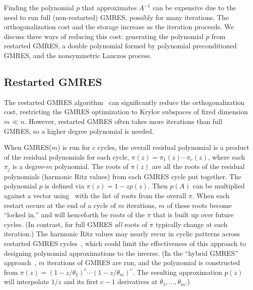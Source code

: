 \documentclass{siamart}
\begin{document}
Finding the polynomial $p$ that approximates $A^{-1}$ can be expensive due to the need to run full (non-restarted) GMRES, possibly for many iterations.  The orthogonalization cost and the storage increase as the iteration proceeds.  We discuss three ways of reducing this cost: generating the polynomial $p$ from restarted GMRES, a double polynomial formed by polynomial preconditioned GMRES, and the nonsymmetric Lanczos process.  

\subsection{Restarted GMRES}

The restarted GMRES algorithm~\cite{SaSc} can significantly reduce the orthogonalization cost, restricting the GMRES optimization to Krylov subspaces of fixed dimension $m\ll n$.  However, restarted GMRES often takes more iterations than full GMRES, so a higher degree polynomial is needed.

When GMRES($m$) is run for $c$ cycles, the overall residual polynomial is a product of the residual polynomials for each cycle, $\pi(z) = \pi_1(z)\cdots \pi_c(z)$, where each $\pi_j$ is a degree-$m$ polynomial. 
The roots of $\pi(z)$ are all the roots of the residual polynomials (harmonic Ritz values) from each GMRES cycle put together. 
The polynomial $p$ is defined via $\pi(z) = 1 - zp(z)$.  Then $p(A)$ can be multiplied against a vector using~\cite[alg.~3]{PPGStable} with the list of roots from the overall $\pi$. 
When each restart occurs at the end of a cycle of $m$ iterations, $m$ of these roots become ``locked in,'' and will henceforth be roots of the $\pi$ that is built up over future cycles.  (In contrast, for full GMRES \emph{all} roots of $\pi$ typically change at each iteration.)  The harmonic Ritz values may nearly recur in cyclic patterns across restarted GMRES cycles~\cite{BaJeMa,CC}, which could limit the effectiveness of this approach to designing polynomial approximations to the inverse.  (In the ``hybrid GMRES'' approach~\cite{NaReTr},  $m$ iterations of GMRES are run, and the polynomial is constructed from $\pi(z) = (1-z/\theta_1)^c \cdots (1-z/\theta_m)^c$.  The resulting approximation $p(z)$ will interpolate $1/z$ and its first $c-1$ derivatives at $\theta_1, \ldots, \theta_m$.)

\end{document}
